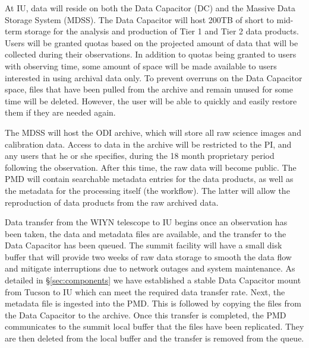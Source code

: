 \documentclass[10pt,conference]{IEEEtran}
\begin{document}
At IU, data will reside on both the Data Capacitor (DC) and the Massive Data Storage System (MDSS).
The Data Capacitor will host 200TB of short to mid-term storage for the analysis and production of Tier 1 and Tier 2 data products. Users will be granted quotas based on the projected amount of data that will be collected during their observations. In addition to quotas being granted to users with observing time, some amount of space will be made available to users interested in using archival data only. To prevent overruns on the Data Capacitor space, files that have been pulled from the archive and remain unused for some time will be deleted. However, the user will be able to quickly and easily restore them if they are needed again.

The MDSS will host the ODI archive, which will store all raw science images and calibration data.
Access to data in the archive will be restricted to the PI, and any users that he or she specifies, during the 18 month proprietary period following the observation. After this time, the raw data will become public. The PMD will contain searchable metadata entries for the data products, as well as the metadata for the processing itself (the workflow). The latter will allow the reproduction of data products from the raw archived data. 

Data transfer from the WIYN telescope to IU begins once an observation has been taken, the data and metadata files are available, and the transfer to the Data Capacitor has been queued. 
The summit facility will have a small disk buffer that will provide two weeks of raw data storage to smooth the data flow and mitigate interruptions due to network outages and system maintenance. As detailed in \S\ref{sec:components} we have established a stable Data Capacitor mount from Tucson to IU which can meet the required data transfer rate. Next, the metadata file is ingested into the PMD. This is followed by copying the files from the Data Capacitor to the archive. Once this transfer is completed, the PMD communicates to the summit local buffer that the files have been replicated. They are then deleted from the local buffer and the transfer is removed from the queue.
\end{document}
